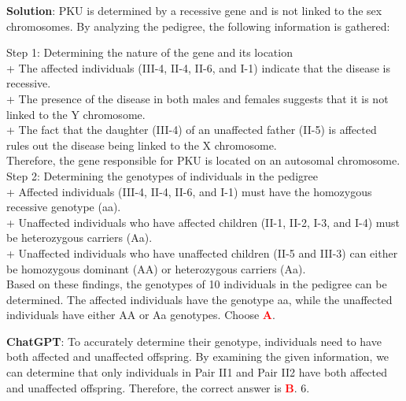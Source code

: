 \documentclass{article}
\begin{document}
{\begin{mdframed}[linewidth=1pt,linecolor=red]
		\begin{oneparchoices}
		\end{oneparchoices}
		
		\textbf{Solution}: PKU is determined by a recessive gene and is not linked to the sex chromosomes. By analyzing the pedigree, the following information is gathered:
		
		Step 1: Determining the nature of the gene and its location \\
		+ The affected individuals (III-4, II-4, II-6, and I-1) indicate that the disease is recessive.\\
		+ The presence of the disease in both males and females suggests that it is not linked to the Y chromosome.\\
		+ The fact that the daughter (III-4) of an unaffected father (II-5) is affected rules out the disease being linked to the X chromosome.\\
		Therefore, the gene responsible for PKU is located on an autosomal chromosome.\\
		Step 2: Determining the genotypes of individuals in the pedigree\\
		+ Affected individuals (III-4, II-4, II-6, and I-1) must have the homozygous recessive genotype (aa).\\
		+ Unaffected individuals who have affected children (II-1, II-2, I-3, and I-4) must be heterozygous carriers (Aa).\\
		+ Unaffected individuals who have unaffected children (II-5 and III-3) can either be homozygous dominant (AA) or heterozygous carriers (Aa).\\
		Based on these findings, the genotypes of 10 individuals in the pedigree can be determined. The affected individuals have the genotype aa, while the unaffected individuals have either AA or Aa genotypes.
		Choose \textcolor{red}{\textbf{A}}. 
		
		\textbf{ChatGPT}: To accurately determine their genotype, individuals need to have both affected and unaffected offspring. By examining the given information, we can determine that only individuals in Pair II1 and Pair II2 have both affected and unaffected offspring. Therefore, the correct answer is \textcolor{red}{\textbf{B}}. 6.
		

\end{mdframed}}
\end{document}

